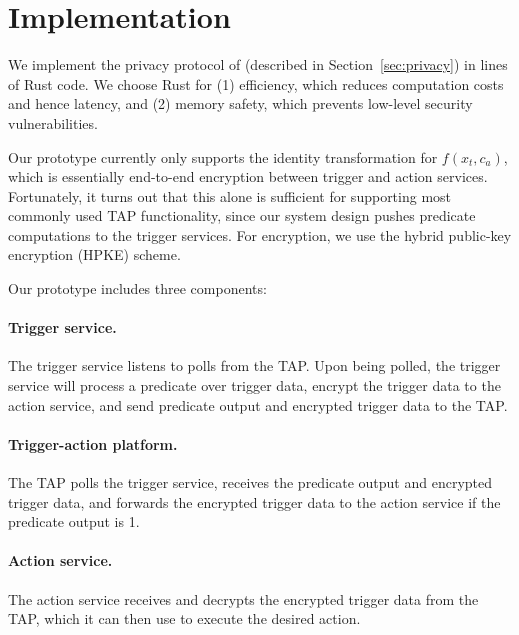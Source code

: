 \section{Implementation}
\label{sec:implementation}

We implement the privacy protocol of \sys (described in
Section~\ref{sec:privacy}) in  lines of Rust code. We choose Rust for
(1) efficiency, which reduces computation costs and hence latency, and (2)
memory safety, which prevents low-level security vulnerabilities.

Our \sys prototype currently only supports the identity transformation for
$f(x_t, c_a)$, which is essentially end-to-end encryption between trigger and
action services. Fortunately, it turns out that this alone is sufficient for
supporting most commonly used TAP functionality, since our system design pushes
predicate computations to the trigger services. For encryption, we use the
hybrid public-key encryption (HPKE) scheme.

Our prototype includes three components:

\paragraph{Trigger service.} The trigger service listens to polls from the
    TAP. Upon being polled, the trigger service will process a predicate over
    trigger data, encrypt the trigger data to the action service, and send
    predicate output and encrypted trigger data to the TAP.
    
\paragraph{Trigger-action platform.} The TAP polls the trigger service,
    receives the predicate output and encrypted trigger data, and forwards the
    encrypted trigger data to the action service if the predicate output is 1.
    
\paragraph{Action service.} The action service receives and decrypts the
    encrypted trigger data from the TAP, which it can then use to execute the
    desired action.

